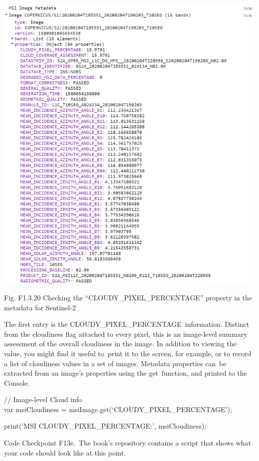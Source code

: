 \documentclass[
  letterpaper,
  DIV=11,
  numbers=noendperiod]{scrreprt}
\begin{document}
\includegraphics{./F1/image35.png}

Fig. F1.3.20 Checking the ``CLOUDY\_PIXEL\_PERCENTAGE'' property in the
metadata for Sentinel-2

The first entry is the CLOUDY\_PIXEL\_PERCENTAGE~information. Distinct
from the cloudiness flag attached to every pixel, this is an image-level
summary assessment of the overall cloudiness in the image. In addition
to viewing the value, you might find it useful to~print it to the
screen, for example, or to record a list of cloudiness values in a set
of images. Metadata properties can~be extracted from an image's
properties using the get~function, and printed to the Console.

// Image-level Cloud info\\
var msiCloudiness = msiImage.get(`CLOUDY\_PIXEL\_PERCENTAGE');

print(`MSI CLOUDY\_PIXEL\_PERCENTAGE:', msiCloudiness);

\begin{tcolorbox}[enhanced jigsaw, left=2mm, breakable, rightrule=.15mm, opacityback=0, colframe=quarto-callout-note-color-frame, colbacktitle=quarto-callout-note-color!10!white, arc=.35mm, opacitybacktitle=0.6, toptitle=1mm, colback=white, leftrule=.75mm, title=\textcolor{quarto-callout-note-color}{\faInfo}\hspace{0.5em}{Note}, toprule=.15mm, bottomtitle=1mm, titlerule=0mm, bottomrule=.15mm, coltitle=black]

Code Checkpoint F13e.~The book's repository contains a script that shows
what your code should look like at this point.

\end{tcolorbox}
\end{document}
